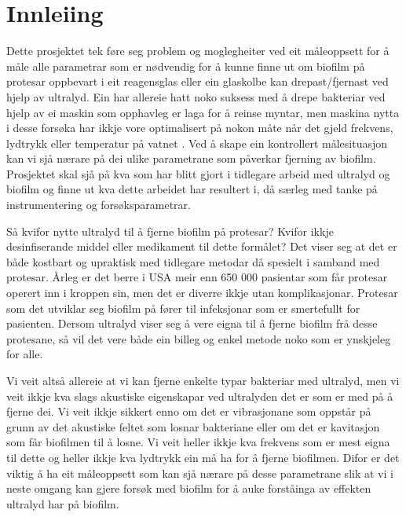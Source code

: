 \section{Innleiing}
Dette prosjektet tek føre seg problem og moglegheiter ved eit måleoppsett for å måle alle parametrar som er nødvendig for å kunne finne ut om biofilm på protesar oppbevart i eit reagensglas eller ein glaskolbe kan drepast/fjernast ved hjelp av ultralyd. Ein har allereie hatt noko suksess med å drepe bakteriar ved hjelp av ei maskin som opphavleg er laga for å reinse myntar, men maskina nytta i desse forsøka har ikkje vore optimalisert på nokon måte når det gjeld frekvens, lydtrykk eller temperatur på vatnet \cite{ultraprotese}. Ved å skape ein kontrollert målesituasjon kan vi sjå nærare på dei ulike parametrane som påverkar fjerning av biofilm. Prosjektet skal sjå på kva som har blitt gjort i tidlegare arbeid med ultralyd og biofilm og finne ut kva dette arbeidet har resultert i, då særleg med tanke på instrumentering og forsøksparametrar.

Så kvifor nytte ultralyd til å fjerne biofilm på protesar? Kvifor ikkje desinfiserande middel eller medikament til dette formålet? Det viser seg at det er både kostbart og upraktisk med tidlegare metodar då spesielt i samband med protesar. Årleg er det berre i USA meir enn 650 000 pasientar som får protesar operert inn i kroppen sin, men det er diverre ikkje utan komplikasjonar\cite{ultraprotese}. Protesar som det utviklar seg biofilm på fører til infeksjonar som er smertefullt for pasienten\cite{infection}. Dersom ultralyd viser seg å vere eigna til å fjerne biofilm frå desse protesane, så vil det vere både ein billeg og enkel metode noko som er ynskjeleg for alle.

Vi veit altså allereie at vi kan fjerne enkelte typar bakteriar med ultralyd, men vi veit ikkje kva slags akustiske eigenskapar ved ultralyden det er som er med på å fjerne dei\cite{ultraprotese}. Vi veit ikkje sikkert enno om det er vibrasjonane som oppstår på grunn av det akustiske feltet som losnar bakteriane eller om det er kavitasjon som får biofilmen til å losne. Vi veit heller ikkje kva frekvens som er mest eigna til dette og heller ikkje kva lydtrykk ein må ha for å fjerne biofilmen. Difor er det viktig å ha eit måleoppsett som kan sjå nærare på desse parametrane slik at vi i neste omgang kan gjere forsøk med biofilm for å auke forståinga av effekten ultralyd har på biofilm.